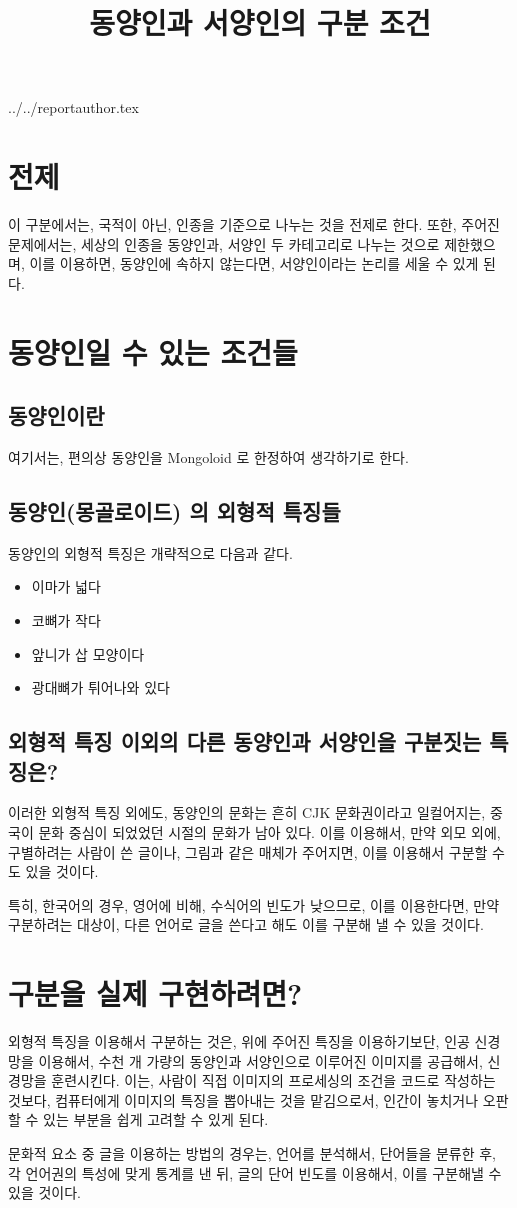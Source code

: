 \documentclass {article}
\begin{document}
\title {동양인과 서양인의 구분 조건}
 {../../reportauthor.tex}
\maketitle

\section {전제}
이 구분에서는, 국적이 아닌, 인종을 기준으로 나누는 것을 전제로 한다. 또한, 주어진 문제에서는,
세상의 인종을 동양인과, 서양인 두 카테고리로 나누는 것으로 제한했으며, 이를 이용하면, 동양인에
속하지 않는다면, 서양인이라는 논리를 세울 수 있게 된다.
\section {동양인일 수 있는 조건들}
\subsection {동양인이란}
여기서는, 편의상 동양인을 Mongoloid 로 한정하여 생각하기로 한다.
\subsection {동양인(몽골로이드) 의 외형적 특징들}
동양인의 외형적 특징은 개략적으로 다음과 같다.
\begin {itemize}
\item 이마가 넓다
\item 코뼈가 작다
\item 앞니가 삽 모양이다
\item 광대뼈가 튀어나와 있다
\end{itemize}
\subsection {외형적 특징 이외의 다른 동양인과 서양인을 구분짓는 특징은?}
이러한 외형적 특징 외에도, 동양인의 문화는 흔히 CJK 문화권이라고 일컬어지는, 중국이 문화 중심이
되었었던 시절의 문화가 남아 있다. 이를 이용해서, 만약 외모 외에, 구별하려는 사람이 쓴 글이나,
그림과 같은 매체가 주어지면, 이를 이용해서 구분할 수도 있을 것이다.

특히, 한국어의 경우, 영어에 비해, 수식어의 빈도가 낮으므로, 이를 이용한다면, 만약 구분하려는
대상이, 다른 언어로 글을 쓴다고 해도 이를 구분해 낼 수 있을 것이다. 
\section {구분을 실제 구현하려면?}
외형적 특징을 이용해서 구분하는 것은, 위에 주어진 특징을 이용하기보단, 인공 신경망을 이용해서,
수천 개 가량의 동양인과 서양인으로 이루어진 이미지를 공급해서, 신경망을 훈련시킨다. 이는,
사람이 직접 이미지의 프로세싱의 조건을 코드로 작성하는 것보다, 컴퓨터에게 이미지의 특징을
뽑아내는 것을 맡김으로서, 인간이 놓치거나 오판할 수 있는 부분을 쉽게 고려할 수 있게 된다.

문화적 요소 중 글을 이용하는 방법의 경우는, 언어를 분석해서, 단어들을 분류한 후, 각 언어권의
특성에 맞게 통계를 낸 뒤, 글의 단어 빈도를 이용해서, 이를 구분해낼 수 있을 것이다.
\end{document}
